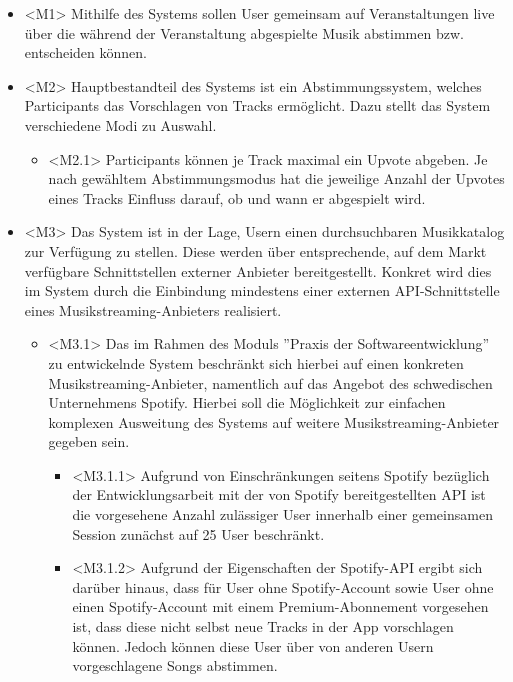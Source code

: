 \documentclass[oneside, ngerman]{sdqtechreport}
\begin{document}
\begin{itemize}
    \item \hypertarget{<M1>}{}<M1> Mithilfe des Systems sollen User gemeinsam auf Veranstaltungen live über die während der Veranstaltung abgespielte Musik abstimmen bzw. entscheiden können.
    \item \hypertarget{<M2>}{}<M2> Hauptbestandteil des Systems ist ein Abstimmungssystem, welches Participants das Vorschlagen von Tracks ermöglicht. Dazu stellt das System verschiedene Modi zu Auswahl.
    \begin{itemize}
        \item \hypertarget{<M2.1>}{}<M2.1> Participants können je Track maximal ein Upvote abgeben. Je nach gewähltem Abstimmungsmodus hat die jeweilige Anzahl der Upvotes eines Tracks Einfluss darauf, ob und wann er abgespielt wird.
    \end{itemize}
    \item \hypertarget{<M3>}{}<M3> Das System ist in der Lage, Usern einen durchsuchbaren Musikkatalog zur Verfügung zu stellen. Diese werden über entsprechende, auf dem Markt verfügbare Schnittstellen externer Anbieter bereitgestellt. Konkret wird dies im System durch die Einbindung mindestens einer externen API-Schnittstelle eines Musikstreaming-Anbieters realisiert.
    \begin{itemize}
        \item \hypertarget{<M3.1>}{}<M3.1> Das im Rahmen des Moduls ''Praxis der Softwareentwicklung'' zu entwickelnde System beschränkt sich hierbei auf einen konkreten Musikstreaming-Anbieter, namentlich auf das Angebot des schwedischen Unternehmens Spotify. Hierbei soll die Möglichkeit zur einfachen komplexen Ausweitung des Systems auf weitere Musikstreaming-Anbieter gegeben sein.
        \begin{itemize}
            \item \hypertarget{<M3.1.1>}{}<M3.1.1> Aufgrund von Einschränkungen seitens Spotify bezüglich der Entwicklungsarbeit mit der von Spotify bereitgestellten API ist die vorgesehene Anzahl zulässiger User innerhalb einer gemeinsamen Session zunächst auf 25 User beschränkt.
            \item \hypertarget{<M3.1.2>}{}<M3.1.2> Aufgrund der Eigenschaften der Spotify-API ergibt sich darüber hinaus, dass für User ohne Spotify-Account sowie User ohne einen Spotify-Account mit einem Premium-Abonnement vorgesehen ist, dass diese nicht selbst neue Tracks in der App vorschlagen können. Jedoch können diese User über von anderen Usern vorgeschlagene Songs abstimmen.
        \end{itemize}


\end{itemize}
\end{itemize}
\end{document}
